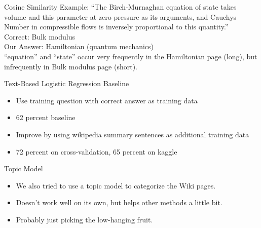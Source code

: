 \documentclass{beamer}
\begin{document}
\begin{frame}{Cosine Similarity}
   Example: ``The Birch-Murnaghan equation of state takes volume and this parameter at zero pressure as its arguments, and Cauchys Number in compressible flows is inversely proportional to this quantity.''\\[1em]
   {\color{green}Correct}: Bulk modulus\\
   {\color{red}Our Answer}: Hamiltonian (quantum mechanics)\\[1em]

   ``equation'' and ``state'' occur very frequently in the Hamiltonian page (long), but infrequently in Bulk modulus page (short).\\
\end{frame}

\begin{frame}{Text-Based Logistic Regression Baseline}
   \begin{itemize}
      \item Use training question with correct answer as training data
      \item 62 percent baseline
      \item Improve by using wikipedia summary sentences as additional training data
      \item 72 percent on cross-validation, 65 percent on kaggle
   \end{itemize}
\end{frame}


\begin{frame}{Topic Model}
   \begin{itemize}
      \item We also tried to use a topic model to categorize the Wiki pages.
      \item Doesn't work well on its own, but helps other methods a little bit.
      \item Probably just picking the low-hanging fruit.
   \end{itemize}
\end{frame}
\end{document}
